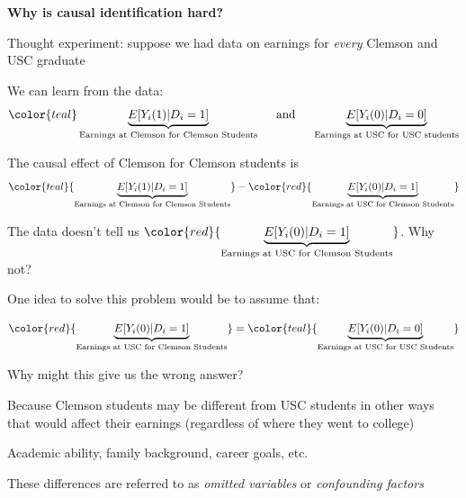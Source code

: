\documentclass[11pt, aspectratio=169]{beamer}
\newenvironment{wideitemize}{\itemize\addtolength{\itemsep}{5pt}}{\enditemize}
\begin{document}
\begin{frame}{\bf \large Why is causal identification hard?}
	
	\begin{wideitemize}
		
		\item
		Thought experiment: suppose we had data on earnings for \textit{every} Clemson and USC graduate
		
		
		\item
		We can learn from the data:
		$$\color{teal} \underbrace{E[ Y_i(1) | D_i=1  ] }_{\text{Earnings at Clemson for Clemson Students}} \hspace{0.5cm}  \text{and} \hspace{0.5cm} \underbrace{E[Y_i(0) | D_i = 0]	}_{\text{Earnings at USC for USC students}}$$
		
		\pause 
		\item
		The causal effect of Clemson for Clemson students is 
		$$ \color{teal}{\underbrace{E[ Y_i(1) | D_i=1  ] }_{\text{Earnings at Clemson for Clemson Students}}} - \color{red}{ \underbrace{E[ Y_i(0) | D_i=1  ] }_{\text{Earnings at USC for Clemson Students}}}$$ 
		
		\pause 
		\item
		The data doesn't tell us $\color{red}{ \underbrace{E[ Y_i(0) | D_i=1 ] }_{\text{Earnings at USC for Clemson Students}}}$. Why not? 
		
	\end{wideitemize}
	
\end{frame}


\begin{frame}
	\begin{wideitemize}
		\item
		One idea to solve this problem would be to assume that: 
		
		$$ \color{red}{ \underbrace{E[ Y_i(0) | D_i=1  ] }_{\text{Earnings at USC for Clemson Students}}} = \color{teal}{ \underbrace{E[ Y_i(0) | D_i=0 ] }_{\text{Earnings at USC for USC Students}}}$$
		
		\item
		Why might this give us the wrong answer? 
		
		\pause
		
		\item
		Because Clemson students may be different from USC students in other ways that would affect their earnings (regardless of where they went to college)
		
			\begin{wideitemize}
				\item 
				Academic ability, family background, career goals, etc.
			\end{wideitemize}
		
		\item
		These differences are referred to as \textit{omitted variables} or \textit{confounding factors}
	\end{wideitemize}
\end{frame}
\end{document}
